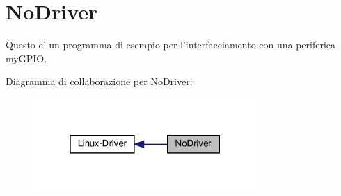 \hypertarget{group___no_driver}{\section{No\+Driver}
\label{group___no_driver}
}


Questo e' un programma di esempio per l'interfacciamento con una periferica my\+G\+P\+I\+O.  


Diagramma di collaborazione per No\+Driver\+:\nopagebreak
\begin{figure}[H]
\begin{center}
\leavevmode
\includegraphics[width=241pt]{group___no_driver}
\end{center}
\end{figure}
